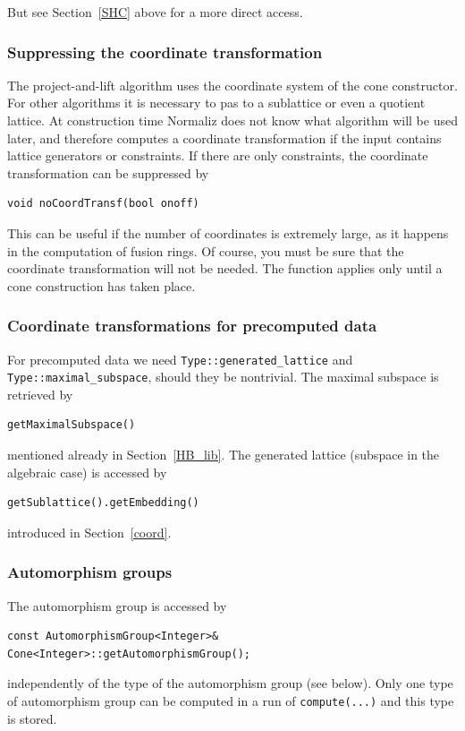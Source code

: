 \begin{small}
But see Section~\ref{SHC} above for a more direct access.

\subsubsection{Suppressing the coordinate transformation}

The project-and-lift algorithm uses the coordinate system of the cone constructor. For other algorithms it is necessary to pas to a sublattice or even a quotient lattice. At construction time Normaliz does not know what algorithm will be used later, and therefore computes a coordinate transformation if the input contains lattice generators or constraints. If there are only constraints, the coordinate transformation can be suppressed by
\begin{Verbatim}
void noCoordTransf(bool onoff)
\end{Verbatim}
This can be useful if the number of coordinates is extremely large, as it happens in the computation of fusion rings. Of course, you must be sure that the coordinate transformation will not be needed. The function applies only until a cone construction has taken place.

\subsubsection{Coordinate transformations for precomputed data}\label{coord_pre}

For precomputed data we need \verb|Type::generated_lattice| and \verb|Type::maximal_subspace|, should they be nontrivial. The maximal subspace is retrieved by
\begin{Verbatim}
getMaximalSubspace()
\end{Verbatim}
mentioned already in Section~\ref{HB_lib}. The generated lattice (subspace in the algebraic case) is accessed by
\begin{Verbatim}
getSublattice().getEmbedding()
\end{Verbatim}
introduced in Section~\ref{coord}.

\subsubsection{Automorphism groups}

The automorphism group is accessed by

\begin{Verbatim}
const AutomorphismGroup<Integer>& Cone<Integer>::getAutomorphismGroup();
\end{Verbatim}
independently of the type of the automorphism group (see below). Only one type of automorphism group can be computed in a run of \verb|compute(...)| and this type is stored.


\end{small}
